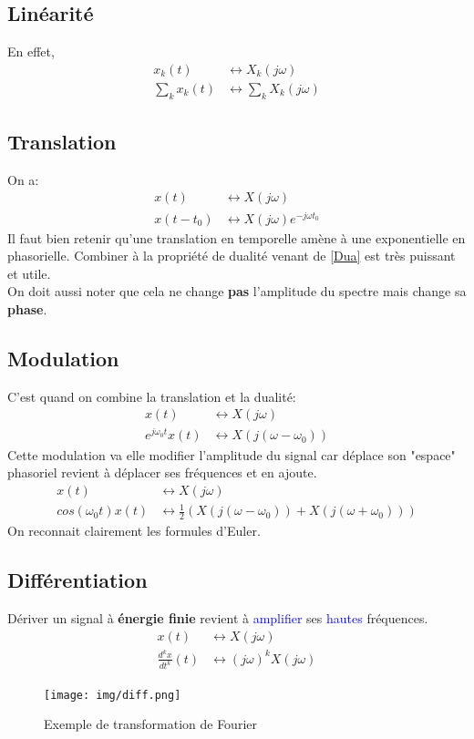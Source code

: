 \documentclass{report}
\begin{document}
\subsection{Linéarité}
En effet,
\begin{align*}
x_k(t) & \longleftrightarrow X_k(j\omega)\\
\sum_k x_k(t) & \longleftrightarrow \sum_k X_k(j\omega)
\end{align*}

\subsection{Translation}
On a:
\begin{align*}
x(t) & \longleftrightarrow X(j\omega)\\
x(t-t_0) & \longleftrightarrow X(j\omega)e^{-j \omega t_0}
\end{align*}
Il faut bien retenir qu'une translation en temporelle amène à une exponentielle en phasorielle. Combiner à la propriété de dualité venant de \ref{Dua} est très puissant et utile.\\
On doit aussi noter que cela ne change \textbf{pas} l'amplitude du spectre mais change sa \textbf{phase}.

\subsection{Modulation}
C'est quand on combine la translation et la dualité:
\begin{align*}
x(t) & \longleftrightarrow X(j\omega)\\
e^{j\omega_0 t}x(t) & \longleftrightarrow X(j(\omega - \omega_0))
\end{align*}
Cette modulation va elle modifier l'amplitude du signal car déplace son "espace" phasoriel revient à déplacer ses fréquences et en ajoute.
\begin{align*}
x(t) & \longleftrightarrow X(j\omega)\\
cos(\omega_0 t)x(t) &\longleftrightarrow \frac{1}{2}(X(j(\omega - \omega_0)) + X(j(\omega + \omega_0))) 
\end{align*}
On reconnait clairement les formules d'Euler.

\subsection{Différentiation}
Dériver un signal à \textbf{énergie finie} revient à \textcolor{blue}{amplifier} ses \textcolor{blue}{hautes} fréquences.
\begin{align*}
x(t) &\longleftrightarrow X(j\omega)\\
\frac{d^kx}{dt^k}(t) &\longleftrightarrow (j\omega)^kX(j\omega)
\end{align*}
\begin{figure}[H]
\centering
\texttt{[image: img/diff.png]}
\caption{Exemple de transformation de Fourier}
\end{figure}
\end{document}
